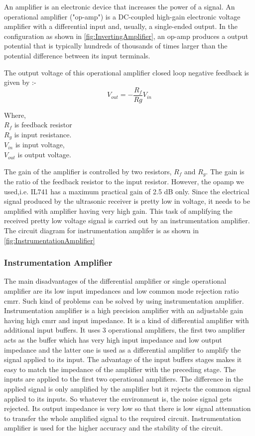 An amplifier is an electronic device that increases the power of a signal. An operational amplifier ("op-amp") is a DC-coupled high-gain electronic voltage amplifier with a differential input and, usually, a single-ended output. In the configuration as shown in \ref{fig:InvertingAmplifier}, an op-amp produces a output potential that is typically hundreds of thousands of times larger than the potential difference between its input terminals. 



The output voltage of this operational amplifier closed loop negative feedback is given by :-
\begin{equation}
	V_{out} = -\frac{R_f}{Rg}V_{in}
\end{equation} 


Where,\\ $R_f$ is feedback resistor \\$R_g$ is input resistance. \\$V_{in}$ is input voltage, \\$V_{out}$ is output voltage. 

The gain of the amplifier is controlled by two resistors, $R_f$ and $R_g$. The gain is the ratio of the feedback resistor to the input resistor. However, the opamp we used,i.e. IL741 has a maximum practical gain of 2.5 dB only. Since the electrical signal produced by the ultrasonic receiver is pretty low in voltage, it needs to be amplified with amplifier having very high gain. This task of amplifying the received pretty low voltage signal is carried out by an instrumentation amplifier. The circuit diagram for instrumentation amplifer is as shown in \ref{fig:InstrumentationAmplifier}

\subsubsection{Instrumentation Amplifier}
The main disadvantages of the differential amplifier or single operational amplifier are its low input impedances and low common mode rejection ratio \gls{cmrr}.  Such kind of problems can be solved by using instrumentation amplifier. Instrumentation amplifier is a high precision amplifier with an adjustable gain having high \gls{cmrr} and input impedance. It is a kind of differential amplifier with additional input buffers. It uses 3 operational amplifiers, the first two amplifier acts as the buffer which has very high input impedance and low output impedance and the latter one is used as a differential amplifier to amplify the signal applied to its input. The advantage of the input buffers stages makes it easy to match the impedance of the amplifier with the preceding stage. The inputs are applied to the first two operational amplifiers. The difference in the applied signal is only amplified by the amplifier but it rejects the common signal applied to its inputs. So whatever the environment is, the noise signal gets rejected. Its output impedance is very low so that there is low signal attenuation to transfer the whole amplified signal to the required circuit. Instrumentation amplifier is used for the higher accuracy and the stability of the circuit.

